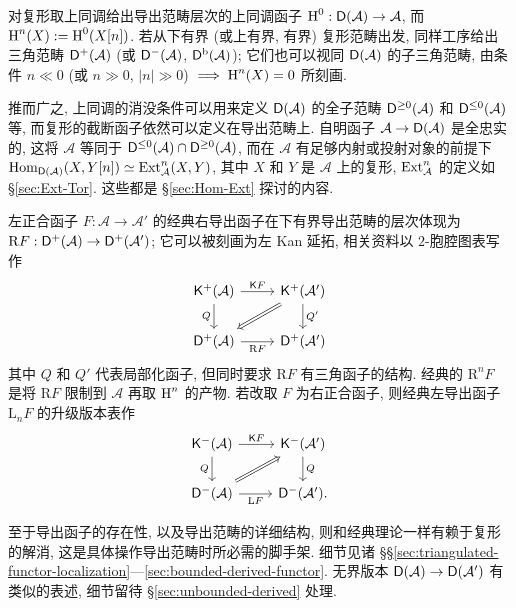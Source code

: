 对复形取上同调给出导出范畴层次的上同调函子 $\operatorname{H}^0: \mathsf{D}(\mathcal{A}) \to \mathcal{A}$, 而 $\operatorname{H}^n(X) := \operatorname{H}^0(X[n])$. 若从下有界 (或上有界, 有界) 复形范畴出发, 同样工序给出三角范畴 $\mathsf{D}^+(\mathcal{A})$ (或 $\mathsf{D}^-(\mathcal{A})$, $\mathsf{D}^{\mathrm{b}}(\mathcal{A})$); 它们也可以视同 $\mathsf{D}(\mathcal{A})$ 的子三角范畴, 由条件 $n \ll 0$ (或 $n \gg 0$, $|n| \gg 0$) $\implies \operatorname{H}^n(X) = 0$ 所刻画.

推而广之, 上同调的消没条件可以用来定义 $\mathsf{D}(\mathcal{A})$ 的全子范畴 $\mathsf{D}^{\geq 0}(\mathcal{A})$ 和 $\mathsf{D}^{\leq 0}(\mathcal{A})$ 等, 而复形的截断函子依然可以定义在导出范畴上. 自明函子 $\mathcal{A} \to \mathsf{D}(\mathcal{A})$ 是全忠实的, 这将 $\mathcal{A}$ 等同于 $\mathsf{D}^{\leq 0}(\mathcal{A}) \cap \mathsf{D}^{\geq 0}(\mathcal{A})$, 而在 $\mathcal{A}$ 有足够内射或投射对象的前提下 $\operatorname{Hom}_{\mathsf{D}(\mathcal{A})}(X, Y[n]) \simeq \operatorname{Ext}^n_{\mathcal{A}}(X, Y)$, 其中 $X$ 和 $Y$ 是 $\mathcal{A}$ 上的复形, $\operatorname{Ext}^n_{\mathcal{A}}$ 的定义如 \S\ref{sec:Ext-Tor}. 这些都是 \S\ref{sec:Hom-Ext} 探讨的内容.

左正合函子 $F: \mathcal{A} \to \mathcal{A}'$ 的经典右导出函子在下有界导出范畴的层次体现为 $\mathrm{R}F: \mathsf{D}^+(\mathcal{A}) \to \mathsf{D}^+(\mathcal{A}')$; 它可以被刻画为左 Kan 延拓, 相关资料以 $2$-胞腔图表写作
\[\begin{tikzcd}
	\cate{K}^+(\mathcal{A}) \arrow[r, "{\cate{K}F}"] \arrow[d, "Q"'] & \cate{K}^+(\mathcal{A}') \arrow[d, "{Q'}"] \arrow[Rightarrow, ld] \\
	\cate{D}^+(\mathcal{A}) \arrow[r, "{\mathrm{R} F}"'] & \cate{D}^+(\mathcal{A}')
\end{tikzcd}\]
其中 $Q$ 和 $Q'$ 代表局部化函子, 但同时要求 $\mathrm{R}F$ 有三角函子的结构. 经典的 $\mathrm{R}^n F$ 是将 $\mathrm{R}F$ 限制到 $\mathcal{A}$ 再取 $\operatorname{H}^n$ 的产物. 若改取 $F$ 为右正合函子, 则经典左导出函子 $\mathrm{L}_n F$ 的升级版本表作
\[\begin{tikzcd}
	\cate{K}^-(\mathcal{A}) \arrow[r, "{\cate{K}F}"] \arrow[d, "Q"'] & \cate{K}^-(\mathcal{A}') \arrow[d, "Q"] \\	\cate{D}^-(\mathcal{A}) \arrow[r, "{\mathrm{L} F}"'] \arrow[ru, Rightarrow] & \cate{D}^-(\mathcal{A}').
\end{tikzcd}\]

至于导出函子的存在性, 以及导出范畴的详细结构, 则和经典理论一样有赖于复形的解消, 这是具体操作导出范畴时所必需的脚手架. 细节见诸 \S\S\ref{sec:triangulated-functor-localization}---\ref{sec:bounded-derived-functor}. 无界版本 $\mathsf{D}(\mathcal{A}) \to \mathsf{D}(\mathcal{A}')$ 有类似的表述, 细节留待 \S\ref{sec:unbounded-derived} 处理.

